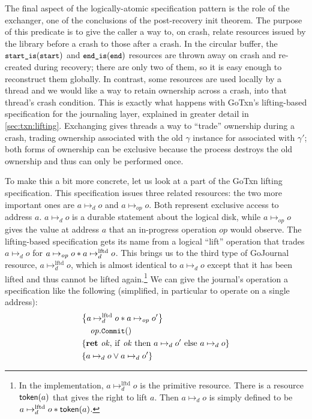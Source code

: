 The final aspect of the logically-atomic specification pattern is the role of
the exchanger, one of the conclusions of the post-recovery init theorem. The
purpose of this predicate is to give the caller a way to, on crash, relate
resources issued by the library before a crash to those after a crash. In the
circular buffer, the $\startIs(\cc{start})$ and $\diskendIs(\cc{end})$ resources
are thrown away on crash and re-created during recovery; there are only two of
them, so it is easy enough to reconstruct them globally. In contrast, some
resources are used locally by a thread and we would like a way to retain
ownership across a crash, into that thread's crash condition. This is exactly
what happens with GoTxn's lifting-based specification for the journaling layer, explained in greater
detail in \cref{sec:txn:lifting}. Exchanging gives threads a way to ``trade''
ownership during a crash, trading ownership associated with the old $\gamma$ instance for
associated with $\gamma'$; both forms of ownership can be
exclusive because the process destroys the old ownership and thus can only be
performed once.

\newcommand{\mapstoDisk}{\mapsto_d}
\newcommand{\mapstoOp}{\mapsto_{\mathit{op}}}
\newcommand{\mapstoLftd}{\mapsto_d^{\mathrm{lftd}}}
\newcommand{\jrnlToken}[1]{\textlog{token}(#1)}

To make this a bit more concrete, let us look at a part of the GoTxn lifting
specification. This specification issues three related resources: the two more important
ones are $a \mapstoDisk o$ and $a \mapstoOp o$. Both represent exclusive
access to address $a$. $a \mapstoDisk o$ is a durable statement about the
logical disk, while $a \mapstoOp o$ gives the value at address $a$ that
an in-progress operation $op$ would observe. The lifting-based specification
gets its name from a logical ``lift'' operation that trades $a \mapstoDisk o$
for $a \mapstoOp o \sep a \mapstoLftd o$. This brings us to the
third type of GoJournal resource, $a \mapstoLftd o$, which is
almost identical to $a \mapstoDisk o$ except that it has been lifted and thus
cannot be lifted again.\footnote{In the implementation,
$a \mapstoLftd o$ is the primitive resource. There is a
resource $\jrnlToken{a}$ that gives the right to lift $a$. Then
$a \mapstoDisk o$ is simply defined to be
$a \mapstoLftd o \sep \jrnlToken{a}$.} We can give
the journal's  operation a
specification like the following (simplified, in particular to operate on a
single address):
%
\begin{align*}
  \hoareCV{a \mapstoLftd o \sep a \mapstoOp o'} %
  {\mathit{op}.\cc{Commit}()}%
  {\Ret{\mathit{ok}} \mathrm{if~} \mathit{ok} %
  \mathrm{~then~} a \mapstoDisk o' \mathrm{~else~} a \mapstoDisk o}%
  {a \mapstoDisk o \lor a \mapstoDisk o'}
\end{align*}

